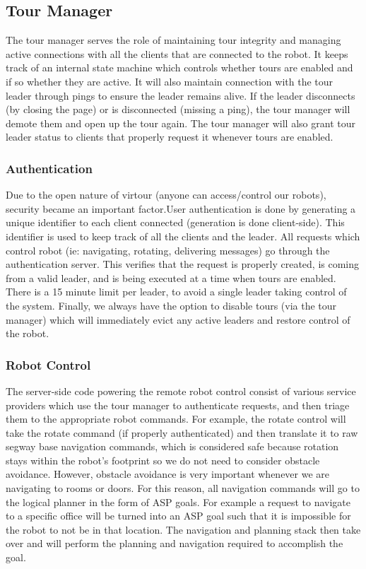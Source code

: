 \documentclass[
  oneside,
  11pt, a4paper,
  footinclude=true,
  headinclude=true,
  cleardoublepage=empty
]{article}
\begin{document}
\subsection{Tour Manager}

The tour manager serves the role of maintaining tour integrity and managing
active connections with all the clients that are connected to the robot. It
keeps track of an internal state machine which controls whether tours are
enabled and if so whether they are active. It will also maintain connection
with the tour leader through pings to ensure the leader remains alive. If the
leader disconnects (by closing the page) or is disconnected (missing a ping),
the tour manager will demote them and open up the tour again. The tour manager
will also grant tour leader status to clients that properly request it whenever
tours are enabled.

\subsubsection{Authentication}

Due to the open nature of virtour (anyone can access/control our robots),
security became an important factor.User authentication is done by generating a
unique identifier to each client connected (generation is done client-side).
This identifier is used to keep track of all the clients and the leader. All
requests which control robot (ie: navigating, rotating, delivering messages) go
through the authentication server. This verifies that the request is properly
created, is coming from a valid leader, and is being executed at a time when
tours are enabled. There is a 15 minute limit per leader, to avoid
a single leader taking control of the system. Finally, we always have the
option to disable tours (via the tour manager) which will immediately evict any
active leaders and restore control of the robot.

\subsubsection{Robot Control}

The server-side code powering the remote robot control consist of various
service providers which use the tour manager to authenticate requests, and then
triage them to the appropriate robot commands. For example, the rotate control
will take the rotate command (if properly authenticated) and then translate it
to raw segway base navigation commands, which is considered safe because
rotation stays within the robot's footprint so we do not need to consider
obstacle avoidance. However, obstacle avoidance is very important whenever we
are navigating to rooms or doors. For this reason, all navigation commands will
go to the logical planner in the form of ASP goals. For example a request to
navigate to a specific office will be turned into an ASP goal such that it is
impossible for the robot to not be in that location. The navigation and
planning stack then take over and will perform the planning and navigation
required to accomplish the goal.
\end{document}
